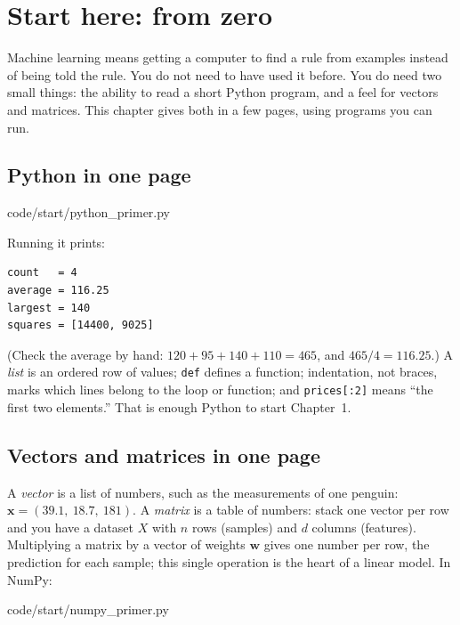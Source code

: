 \chapter*{Start here: from zero}

Machine learning means getting a computer to find a rule from examples instead
of being told the rule. You do not need to have used it before. You do need two
small things: the ability to read a short Python program, and a feel for vectors
and matrices. This chapter gives both in a few pages, using programs you can run.

\section*{Python in one page}


{code/start/python_primer.py}

Running it prints:
\begin{lstlisting}[numbers=none]
count   = 4
average = 116.25
largest = 140
squares = [14400, 9025]
\end{lstlisting}
(Check the average by hand: $120+95+140+110=465$, and $465/4=116.25$.)
A \emph{list} is an ordered row of values; \texttt{def} defines a function;
indentation, not braces, marks which lines belong to the loop or function; and
\texttt{prices[:2]} means ``the first two elements.'' That is enough Python to
start Chapter~1.

\section*{Vectors and matrices in one page}

A \emph{vector} is a list of numbers, such as the measurements of one penguin:
$\mathbf x=(39.1,\ 18.7,\ 181)$. A \emph{matrix} is a table of numbers: stack one
vector per row and you have a dataset $X$ with $n$ rows (samples) and $d$ columns
(features). Multiplying a matrix by a vector of weights $\mathbf w$ gives one
number per row, the prediction for each sample; this single operation is the
heart of a linear model. In NumPy:


{code/start/numpy_primer.py}

